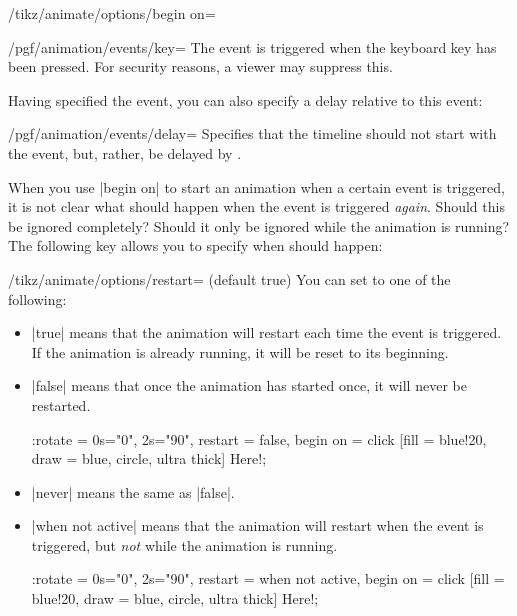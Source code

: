 \begin{key}{/tikz/animate/options/begin on=}
    \begin{key}{/pgf/animation/events/key=}
        The event is triggered when the keyboard key  has been
        pressed. For security reasons, a viewer may suppress this.
    \end{key}

    Having specified the event, you can also specify a delay relative to this
    event:

    \begin{key}{/pgf/animation/events/delay=}
        Specifies that the timeline should not start with the event, but,
        rather, be delayed by .
    \end{key}
\end{key}

When you use |begin on| to start an animation when a certain event is
triggered, it is not clear what should happen when the event is triggered
\emph{again}. Should this be ignored completely? Should it only be ignored
while the animation is running? The following key allows you to specify when
should happen:

\begin{key}{/tikz/animate/options/restart= (default true)}
    You can set  to one of the following:
    \begin{itemize}
        \item |true| means that the animation will restart each time the event
            is triggered. If the animation is already running, it will be reset
            to its beginning.
        \item |false| means that once the animation has started once, it will
            never be restarted.
\begin{codeexample}[imagesource={standalone/pgfmanual-en-tikz-animations-animation-69.svg}]
\tikz \node :rotate = { 0s="0", 2s="90",
                        restart = false, begin on = {click}}
    [fill = blue!20, draw = blue, circle, ultra thick] {Here!};
\end{codeexample}
        \item |never| means the same as |false|.
        \item |when not active| means that the animation will restart when the
            event is triggered, but \emph{not} while the animation is running.
\begin{codeexample}[imagesource={standalone/pgfmanual-en-tikz-animations-animation-70.svg}]
\tikz \node :rotate = { 0s="0", 2s="90",
                        restart = when not active, begin on = {click}}
    [fill = blue!20, draw = blue, circle, ultra thick] {Here!};
\end{codeexample}
    \end{itemize}
\end{key}

